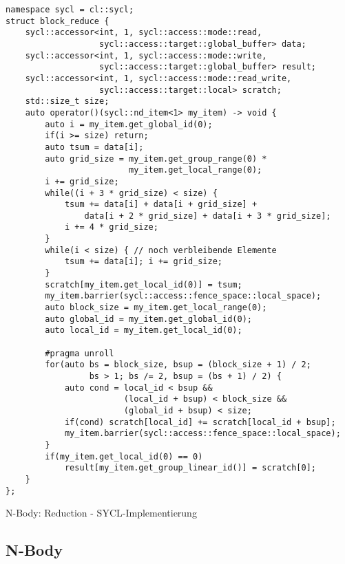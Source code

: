 \begin{code}
    \begin{verbatim}
namespace sycl = cl::sycl;
struct block_reduce {
    sycl::accessor<int, 1, sycl::access::mode::read,
                   sycl::access::target::global_buffer> data;
    sycl::accessor<int, 1, sycl::access::mode::write,
                   sycl::access::target::global_buffer> result;
    sycl::accessor<int, 1, sycl::access::mode::read_write,
                   sycl::access::target::local> scratch;
    std::size_t size;
    auto operator()(sycl::nd_item<1> my_item) -> void {
        auto i = my_item.get_global_id(0);
        if(i >= size) return;
        auto tsum = data[i];
        auto grid_size = my_item.get_group_range(0) *
                         my_item.get_local_range(0);
        i += grid_size;
        while((i + 3 * grid_size) < size) {
            tsum += data[i] + data[i + grid_size] +
                data[i + 2 * grid_size] + data[i + 3 * grid_size];
            i += 4 * grid_size;
        }
        while(i < size) { // noch verbleibende Elemente
            tsum += data[i]; i += grid_size;
        }
        scratch[my_item.get_local_id(0)] = tsum;
        my_item.barrier(sycl::access::fence_space::local_space);
        auto block_size = my_item.get_local_range(0);
        auto global_id = my_item.get_global_id(0);
        auto local_id = my_item.get_local_id(0);

        #pragma unroll
        for(auto bs = block_size, bsup = (block_size + 1) / 2;
                 bs > 1; bs /= 2, bsup = (bs + 1) / 2) {
            auto cond = local_id < bsup &&
                        (local_id + bsup) < block_size &&
                        (global_id + bsup) < size;
            if(cond) scratch[local_id] += scratch[local_id + bsup];
            my_item.barrier(sycl::access::fence_space::local_space);
        }
        if(my_item.get_local_id(0) == 0)
            result[my_item.get_group_linear_id()] = scratch[0];
    }
};
    \end{verbatim}
    \caption{N-Body: Reduction - SYCL-Implementierung}
    \label{anhang:sycl:reduction}
\end{code}

\subsection{N-Body}

